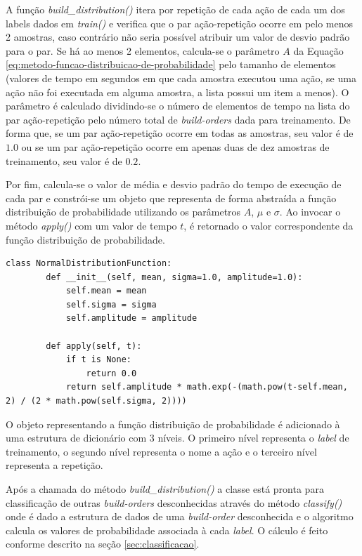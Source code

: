 A função \textit{build\_distribution()} itera por repetição de cada ação de cada um dos labels dados em \textit{train()} e verifica que o par ação-repetição ocorre em pelo menos 2 amostras, caso contrário não seria possível atribuir um valor de desvio padrão para o par. Se há ao menos 2 elementos, calcula-se o parâmetro $A$ da Equação \ref{eq:metodo-funcao-distribuicao-de-probabilidade} pelo tamanho de elementos (valores de tempo em segundos em que cada amostra executou uma ação, se uma ação não foi executada em alguma amostra, a lista possui um item a menos). O parâmetro é calculado dividindo-se o número de elementos de tempo na lista do par ação-repetição pelo número total de \textit{\glspl{build-order}} dada para treinamento. De forma que, se um par ação-repetição ocorre em todas as amostras, seu valor é de $1.0$ ou se um par ação-repetição ocorre em apenas duas de dez amostras de treinamento, seu valor é de $0.2$.

Por fim, calcula-se o valor de média e desvio padrão do tempo de execução de cada par e constrói-se um objeto que representa de forma abstraída a função distribuição de probabilidade utilizando os parâmetros $A$, $\mu$ e $\sigma$. Ao invocar o método \textit{apply()} com um valor de tempo $t$, é retornado o valor correspondente da função distribuição de probabilidade.

\begin{lstlisting}[breaklines=true]
	class NormalDistributionFunction:
    	def __init__(self, mean, sigma=1.0, amplitude=1.0):
        	self.mean = mean
        	self.sigma = sigma
        	self.amplitude = amplitude

    	def apply(self, t):
        	if t is None:
            	return 0.0
        	return self.amplitude * math.exp(-(math.pow(t-self.mean, 2) / (2 * math.pow(self.sigma, 2))))
\end{lstlisting}

O objeto representando a função distribuição de probabilidade é adicionado à uma estrutura de dicionário com 3 níveis. O primeiro nível representa o \textit{label} de treinamento, o segundo nível representa o nome a ação e o terceiro nível representa a repetição.

Após a chamada do método \textit{build\_distribution()} a classe está pronta para classificação de outras \textit{\glspl{build-order}} desconhecidas através do método \textit{classify()} onde é dado a estrutura de dados de uma \textit{\gls{build-order}} desconhecida e o algoritmo calcula os valores de probabilidade associada à cada \textit{label}. O cálculo é feito conforme descrito na seção \ref{sec:classificacao}.

